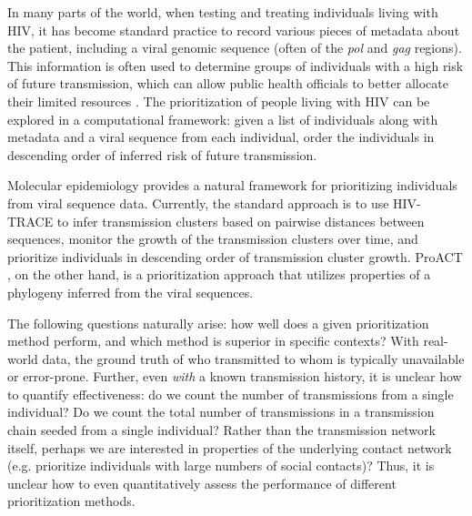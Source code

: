 \documentclass[twocolumn]{bmcart}%
\begin{document}
In many parts of the world, when testing and treating individuals living with HIV, it has become standard practice to record various pieces of metadata about the patient, including a viral genomic sequence (often of the \textit{pol} and \textit{gag} regions). This information is often used to determine groups of individuals with a high risk of future transmission, which can allow public health officials to better allocate their limited resources \cite{wertheim2018growth}. 
The prioritization of people living with HIV can be explored in a computational framework: given a list of individuals along with metadata and a viral sequence from each individual, order the individuals in descending order of inferred risk of future transmission.

Molecular epidemiology provides a natural framework for prioritizing individuals from viral sequence data. Currently, the standard approach is to use HIV-TRACE \cite{pond2018hivtrace} to infer transmission clusters based on pairwise distances between sequences, monitor the growth of the transmission clusters over time, and prioritize individuals in descending order of transmission cluster growth. ProACT \cite{moshiri2019ProACT}, on the other hand, is a prioritization approach that utilizes properties of a phylogeny inferred from the viral sequences.

The following questions naturally arise: how well does a given prioritization method perform, and which method is superior in specific contexts? With real-world data, the ground truth of who transmitted to whom is typically unavailable or error-prone. Further, even \textit{with} a known transmission history, it is unclear how to quantify effectiveness: do we count the number of transmissions from a single individual? Do we count the total number of transmissions in a transmission chain seeded from a single individual? Rather than the transmission network itself, perhaps we are interested in properties of the underlying contact network (e.g. prioritize individuals with large numbers of social contacts)? Thus, it is unclear how to even quantitatively assess the performance of different prioritization methods.
\end{document}
